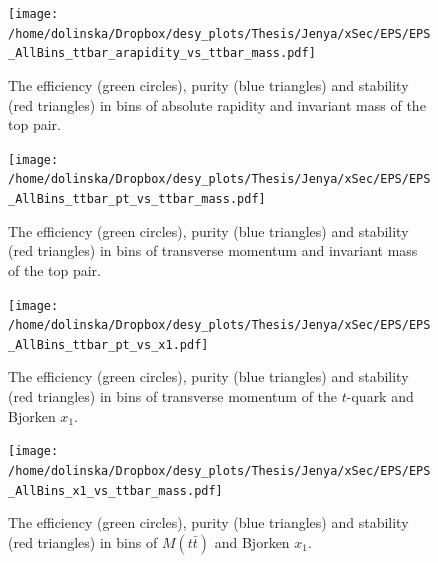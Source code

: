 \begin{figure}[p]
  \centering
  \texttt{[image: /home/dolinska/Dropbox/desy\_plots/Thesis/Jenya/xSec/EPS/EPS\_AllBins\_ttbar\_arapidity\_vs\_ttbar\_mass.pdf]}
  \caption{The efficiency (green circles), purity (blue triangles) and stability (red triangles) in bins of absolute rapidity and invariant mass of the top pair.}
  \label{fig:EPS_2D_ytt_Mtt}
\end{figure}

\begin{figure}[p]
  \centering
  \texttt{[image: /home/dolinska/Dropbox/desy\_plots/Thesis/Jenya/xSec/EPS/EPS\_AllBins\_ttbar\_pt\_vs\_ttbar\_mass.pdf]}
  \caption{The efficiency (green circles), purity (blue triangles) and stability (red triangles) in bins of transverse momentum and invariant mass of the top pair.}
  \label{fig:EPS_2D_pttt_Mtt}
\end{figure}

\begin{figure}[p]
  \centering
  \texttt{[image: /home/dolinska/Dropbox/desy\_plots/Thesis/Jenya/xSec/EPS/EPS\_AllBins\_ttbar\_pt\_vs\_x1.pdf]}
  \caption{The efficiency (green circles), purity (blue triangles) and stability (red triangles) in bins of transverse momentum of the $t$-quark and Bjorken $x_{1}$.}
  \label{fig:EPS_2D_ptt_x1}
\end{figure}

\begin{figure}[p]
  \centering
  \texttt{[image: /home/dolinska/Dropbox/desy\_plots/Thesis/Jenya/xSec/EPS/EPS\_AllBins\_x1\_vs\_ttbar\_mass.pdf]}
  \caption{The efficiency (green circles), purity (blue triangles) and stability (red triangles) in bins of $M(t\bar{t})$ and Bjorken $x_{1}$.}
  \label{fig:EPS_2D_Mtt_x1}
\end{figure}



